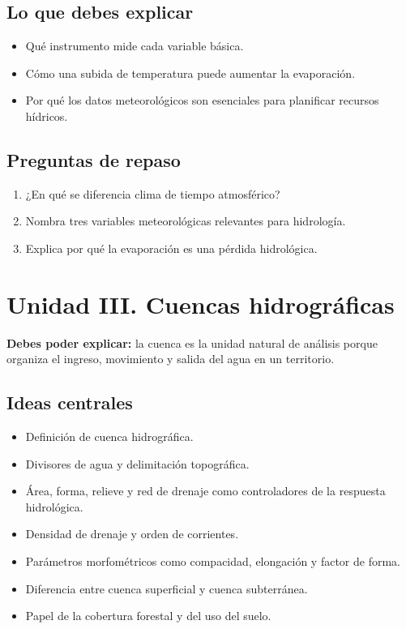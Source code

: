 \documentclass[11pt]{article}
\begin{document}
\subsection{Lo que debes explicar}
\begin{itemize}
\item Qué instrumento mide cada variable básica.
\item Cómo una subida de temperatura puede aumentar la evaporación.
\item Por qué los datos meteorológicos son esenciales para planificar recursos hídricos.
\end{itemize}

\subsection{Preguntas de repaso}
\begin{enumerate}
\item ¿En qué se diferencia clima de tiempo atmosférico?
\item Nombra tres variables meteorológicas relevantes para hidrología.
\item Explica por qué la evaporación es una pérdida hidrológica.
\end{enumerate}

\section{Unidad III. Cuencas hidrográficas}
\begin{conceptbox}
\textbf{Debes poder explicar:} la cuenca es la unidad natural de análisis porque organiza el ingreso, movimiento y salida del agua en un territorio.
\end{conceptbox}

\subsection{Ideas centrales}
\begin{itemize}
\item Definición de cuenca hidrográfica.
\item Divisores de agua y delimitación topográfica.
\item Área, forma, relieve y red de drenaje como controladores de la respuesta hidrológica.
\item Densidad de drenaje y orden de corrientes.
\item Parámetros morfométricos como compacidad, elongación y factor de forma.
\item Diferencia entre cuenca superficial y cuenca subterránea.
\item Papel de la cobertura forestal y del uso del suelo.
\end{itemize}
\end{document}
